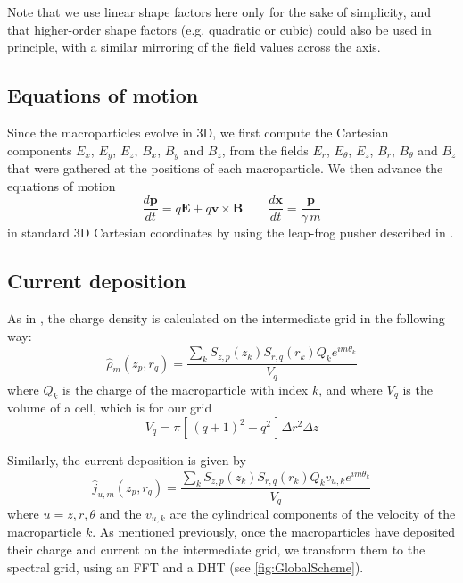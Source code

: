 \documentclass[1p,times]{elsarticle}
\renewcommand{\vec}[1]{\boldsymbol{#1}}
\begin{document}
Note that we use linear shape factors here only for
the sake of simplicity, and that higher-order shape factors
(e.g. quadratic or cubic) could also be used in principle, with
a similar mirroring of the field values across the axis.

\subsection{Equations of motion}
\label{sec:eq-motion}

Since the macroparticles evolve in 3D, we first compute
the Cartesian components $E_x$, $E_y$, $E_z$, $B_x$, $B_y$ and
$B_z$, from the fields $E_r$, $E_\theta$, $E_z$, $B_r$, $B_\theta$ and
$B_z$ that were gathered at the positions of each macroparticle. 
We then advance the equations of motion
\begin{equation} \frac{d\vec{p}}{dt} = q\vec{E} + q\vec{v}\times \vec{B} \qquad
\frac{d\vec{x}}{dt} = \frac{\vec{p}}{\gamma \,m} \end{equation}
\noindent  in standard 3D Cartesian coordinates by using the leap-frog pusher described in \cite{VayPoP2008}.

\subsection{Current deposition}
\label{sec:current-deposition}

As in \cite{Lifschitz}, the charge density is calculated on the intermediate grid in the
following way:
\begin{equation} \hat{\rho}_m(z_p,r_q) = \frac{ \sum_k  S_{z,p}(z_k)S_{r,q}(r_k) Q_k e^{im\theta_k}}{V_{q}} \end{equation}
where $Q_k$ is the charge of the macroparticle with index $k$, and
where $V_q$ is the volume of a cell, which is for our grid
\begin{equation} V_{q} = \pi [\, (q+1)^2- q^2\,] \Delta r^2 \Delta z \end{equation}

\noindent Similarly, the current deposition is given by
\begin{equation} \hat{j}_{u,m}(z_p,r_q) = \frac{\sum_k S_{z,p}(z_k) S_{r,q}(r_k)
Q_k v_{u,k} e^{im\theta_k}}{V_{q}} \end{equation}
where $u = z,r,\theta$ and the $v_{u,k}$ are the cylindrical components of the
velocity of the macroparticle $k$. As mentioned previously, once the
macroparticles have deposited their charge and current on the
intermediate grid, we transform them to the spectral grid, using an
FFT and a DHT (see \cref{fig:GlobalScheme}).
\end{document}
